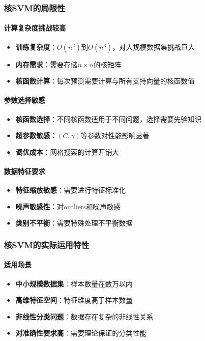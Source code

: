 \documentclass[UTF8]{report}
\theoremstyle{MyLineTheoremStyle} %
\theoremstyle{MyBlockTheoremStyle} %
\theoremstyle{MySubsubsectionStyle} %
\begin{document}
\subsubsection{核SVM的局限性}

\paragraph{计算复杂度挑战较高}
\begin{itemize}
    \item \textbf{训练复杂度}：$O(n^2)$到$O(n^3)$，对大规模数据集挑战巨大
    \item \textbf{内存需求}：需要存储$n \times n$的核矩阵
    \item \textbf{核函数计算}：每次预测需要计算与所有支持向量的核函数值
\end{itemize}

\paragraph{参数选择敏感}
\begin{itemize}
    \item \textbf{核函数选择}：不同核函数适用于不同问题，选择需要先验知识
    \item \textbf{超参数敏感}：$(C, \gamma)$等参数对性能影响显著
    \item \textbf{调优成本}：网格搜索的计算开销大
\end{itemize}

\paragraph{数据特征要求}
\begin{itemize}
    \item \textbf{特征缩放敏感}：需要进行特征标准化
    \item \textbf{噪声敏感性}：对outliers和噪声敏感
    \item \textbf{类别不平衡}：需要特殊处理不平衡数据
\end{itemize}

\subsubsection{核SVM的实际运用特性}

\paragraph{适用场景}
\begin{itemize}
    \item \textbf{中小规模数据集}：样本数量在数万以内
    \item \textbf{高维特征空间}：特征维度高于样本数量
    \item \textbf{非线性分类问题}：数据存在复杂的非线性关系
    \item \textbf{对准确性要求高}：需要理论保证的分类性能
\end{itemize}
\end{document}

